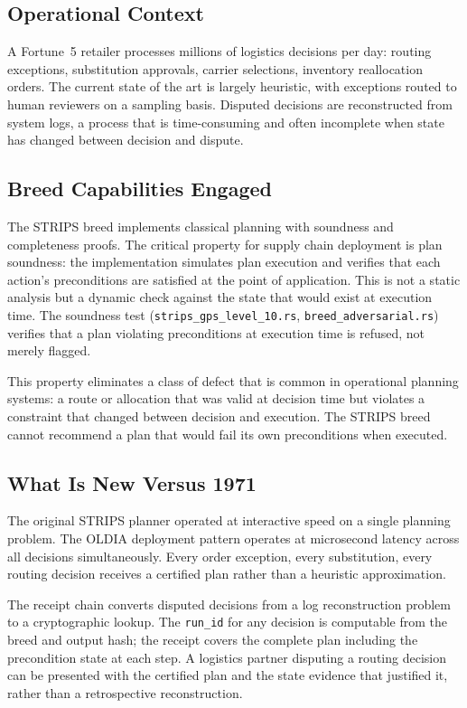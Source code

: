 \subsection*{Operational Context}

A Fortune~5 retailer processes millions of logistics decisions per day: routing
exceptions, substitution approvals, carrier selections, inventory reallocation
orders. The current state of the art is largely heuristic, with exceptions routed
to human reviewers on a sampling basis. Disputed decisions are reconstructed from
system logs, a process that is time-consuming and often incomplete when state has
changed between decision and dispute.

\subsection*{Breed Capabilities Engaged}

The STRIPS breed implements classical planning with soundness and completeness
proofs. The critical property for supply chain deployment is plan soundness:
the implementation simulates plan execution and verifies that each action's
preconditions are satisfied at the point of application. This is not a static
analysis but a dynamic check against the state that would exist at execution time.
The soundness test (\texttt{strips\_gps\_level\_10.rs}, \texttt{breed\_adversarial.rs})
verifies that a plan violating preconditions at execution time is refused, not
merely flagged.

This property eliminates a class of defect that is common in operational planning
systems: a route or allocation that was valid at decision time but violates a
constraint that changed between decision and execution. The STRIPS breed cannot
recommend a plan that would fail its own preconditions when executed.

\subsection*{What Is New Versus 1971}

The original STRIPS planner operated at interactive speed on a single planning
problem. The OLDIA deployment pattern operates at microsecond latency across all
decisions simultaneously. Every order exception, every substitution, every routing
decision receives a certified plan rather than a heuristic approximation.

The receipt chain converts disputed decisions from a log reconstruction problem
to a cryptographic lookup. The \texttt{run\_id} for any decision is computable
from the breed and output hash; the receipt covers the complete plan including
the precondition state at each step. A logistics partner disputing a routing
decision can be presented with the certified plan and the state evidence that
justified it, rather than a retrospective reconstruction.

